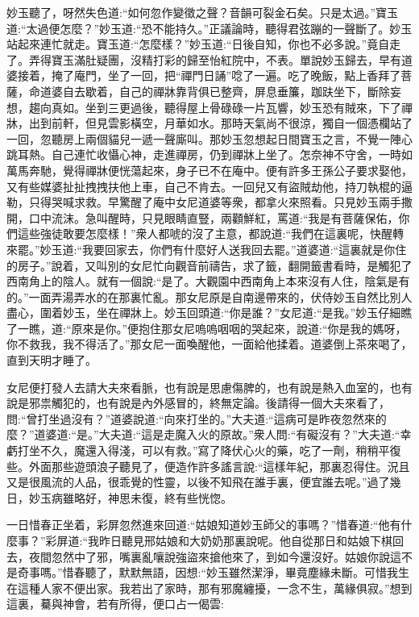 \begin{parag}
    妙玉聽了，呀然失色道:“如何忽作變徵之聲？音韻可裂金石矣。只是太過。”寶玉道:“太過便怎麼？”妙玉道:“恐不能持久。”正議論時，聽得君弦蹦的一聲斷了。妙玉站起來連忙就走。寶玉道:“怎麼樣？”妙玉道:“日後自知，你也不必多說。”竟自走了。弄得寶玉滿肚疑團，沒精打彩的歸至怡紅院中，不表。單說妙玉歸去，早有道婆接着，掩了庵門，坐了一回，把“禪門日誦”唸了一遍。吃了晚飯，點上香拜了菩薩，命道婆自去歇着，自己的禪牀靠背俱已整齊，屏息垂簾，跏趺坐下，斷除妄想，趨向真如。坐到三更過後，聽得屋上骨碌碌一片瓦響，妙玉恐有賊來，下了禪牀，出到前軒，但見雲影橫空，月華如水。那時天氣尚不很涼，獨自一個憑欄站了一回，忽聽房上兩個貓兒一遞一聲廝叫。那妙玉忽想起日間寶玉之言，不覺一陣心跳耳熱。自己連忙收懾心神，走進禪房，仍到禪牀上坐了。怎奈神不守舍，一時如萬馬奔馳，覺得禪牀便恍蕩起來，身子已不在庵中。便有許多王孫公子要求娶他，又有些媒婆扯扯拽拽扶他上車，自己不肯去。一回兒又有盜賊劫他，持刀執棍的逼勒，只得哭喊求救。早驚醒了庵中女尼道婆等衆，都拿火來照看。只見妙玉兩手撒開，口中流沫。急叫醒時，只見眼睛直豎，兩顴鮮紅，罵道:“我是有菩薩保佑，你們這些強徒敢要怎麼樣！”衆人都唬的沒了主意，都說道:“我們在這裏呢，快醒轉來罷。”妙玉道:“我要回家去，你們有什麼好人送我回去罷。”道婆道:“這裏就是你住的房子。”說着，又叫別的女尼忙向觀音前禱告，求了籤，翻開籤書看時，是觸犯了西南角上的陰人。就有一個說:“是了。大觀園中西南角上本來沒有人住，陰氣是有的。”一面弄湯弄水的在那裏忙亂。那女尼原是自南邊帶來的，伏侍妙玉自然比別人盡心，圍着妙玉，坐在禪牀上。妙玉回頭道:“你是誰？”女尼道:“是我。”妙玉仔細瞧了一瞧，道:“原來是你。”便抱住那女尼嗚嗚咽咽的哭起來，說道:“你是我的媽呀，你不救我，我不得活了。”那女尼一面喚醒他，一面給他揉着。道婆倒上茶來喝了，直到天明才睡了。
\end{parag}


\begin{parag}
    女尼便打發人去請大夫來看脈，也有說是思慮傷脾的，也有說是熱入血室的，也有說是邪祟觸犯的，也有說是內外感冒的，終無定論。後請得一個大夫來看了，問:“曾打坐過沒有？”道婆說道:“向來打坐的。”大夫道:“這病可是昨夜忽然來的麼？”道婆道:“是。”大夫道:“這是走魔入火的原故。”衆人問:“有礙沒有？”大夫道:“幸虧打坐不久，魔還入得淺，可以有救。”寫了降伏心火的藥，吃了一劑，稍稍平復些。外面那些遊頭浪子聽見了，便造作許多謠言說:“這樣年紀，那裏忍得住。況且又是很風流的人品，很乖覺的性靈，以後不知飛在誰手裏，便宜誰去呢。”過了幾日，妙玉病雖略好，神思未復，終有些恍惚。
\end{parag}


\begin{parag}
    一日惜春正坐着，彩屏忽然進來回道:“姑娘知道妙玉師父的事嗎？”惜春道:“他有什麼事？”彩屏道:“我昨日聽見邢姑娘和大奶奶那裏說呢。他自從那日和姑娘下棋回去，夜間忽然中了邪，嘴裏亂嚷說強盜來搶他來了，到如今還沒好。姑娘你說這不是奇事嗎。”惜春聽了，默默無語，因想:“妙玉雖然潔淨，畢竟塵緣未斷。可惜我生在這種人家不便出家。我若出了家時，那有邪魔纏擾，一念不生，萬緣俱寂。”想到這裏，驀與神會，若有所得，便口占一偈雲:
\end{parag}

